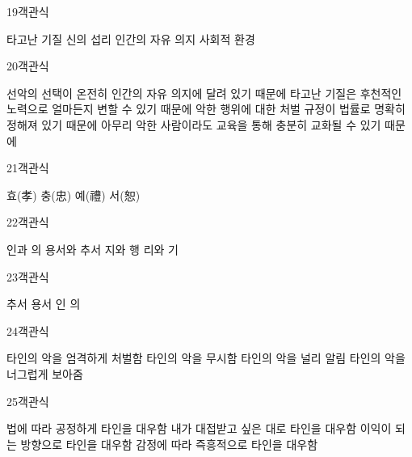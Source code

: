 \documentclass[fs9,seriesRus]{korfarm-base}
\begin{document}
\begin{kfQBlock}{19}{객관식}
\begin{kfChoices}
\kfChoice 타고난 기질
\kfChoice 신의 섭리
\kfChoice 인간의 자유 의지
\kfChoice 사회적 환경
\end{kfChoices}
\end{kfQBlock}
\begin{kfQBlock}{20}{객관식}
\begin{kfChoices}
\kfChoice 선악의 선택이 온전히 인간의 자유 의지에 달려 있기 때문에
\kfChoice 타고난 기질은 후천적인 노력으로 얼마든지 변할 수 있기 때문에
\kfChoice 악한 행위에 대한 처벌 규정이 법률로 명확히 정해져 있기 때문에
\kfChoice 아무리 악한 사람이라도 교육을 통해 충분히 교화될 수 있기 때문에
\end{kfChoices}
\end{kfQBlock}
\begin{kfQBlock}{21}{객관식}
\begin{kfChoices}
\kfChoice 효(孝)
\kfChoice 충(忠)
\kfChoice 예(禮)
\kfChoice 서(恕)
\end{kfChoices}
\end{kfQBlock}
\begin{kfQBlock}{22}{객관식}
\begin{kfChoices}
\kfChoice 인과 의
\kfChoice 용서와 추서
\kfChoice 지와 행
\kfChoice 리와 기
\end{kfChoices}
\end{kfQBlock}
\begin{kfQBlock}{23}{객관식}
\begin{kfChoices}
\kfChoice 추서
\kfChoice 용서
\kfChoice 인
\kfChoice 의
\end{kfChoices}
\end{kfQBlock}
\begin{kfQBlock}{24}{객관식}
\begin{kfChoices}
\kfChoice 타인의 악을 엄격하게 처벌함
\kfChoice 타인의 악을 무시함
\kfChoice 타인의 악을 널리 알림
\kfChoice 타인의 악을 너그럽게 보아줌
\end{kfChoices}
\end{kfQBlock}
\begin{kfQBlock}{25}{객관식}
\begin{kfChoices}
\kfChoice 법에 따라 공정하게 타인을 대우함
\kfChoice 내가 대접받고 싶은 대로 타인을 대우함
\kfChoice 이익이 되는 방향으로 타인을 대우함
\kfChoice 감정에 따라 즉흥적으로 타인을 대우함
\end{kfChoices}
\end{kfQBlock}
\end{document}

